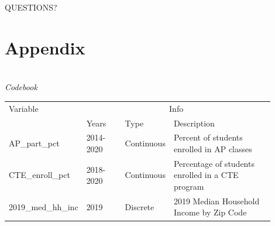 \documentclass[10pt]{beamer}
\begin{document}
{
\begin{frame}[standout]
  \LARGE QUESTIONS?
\end{frame}
}


\section{Appendix}

\begin{frame}
    \raggedleft
    \begin{threeparttable}
        \renewcommand\thetable{1}
        \caption{\\\textit{Codebook}}
        \begin{tabular}{ p{0.22\linewidth} p{0.15\linewidth} p{0.13\linewidth} p{0.4\linewidth}}
            \toprule
            Variable & \multicolumn{3}{c}{Info} \\
            \cmidrule(r){2-4}
            &   Years    &    Type                 &  Description \\ 
            \midrule
            AP\_part\_pct  & 2014-2020 &  Continuous   &   Percent of students enrolled in AP classes\\
            CTE\_enroll\_pct& 2018-2020  &  Continuous                  &  Percentage of students enrolled in a CTE program     \\
            2019\_med\_hh\_inc                     &  2019   &     Discrete         &   2019 Median Household Income by Zip Code           \\
            \midrule
        \end{tabular}
        \end{threeparttable}
\end{frame}
\end{document}
